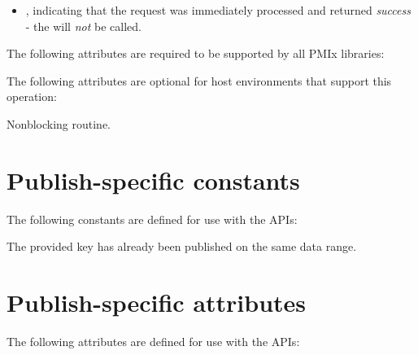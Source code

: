 \returnsimplenb

\returnstart
\begin{itemize}
    \item {}, indicating that the request was immediately processed and returned \textit{success} - the  will \textit{not} be called.
\end{itemize}
\returnend

\reqattrstart
The following attributes are required to be supported by all PMIx libraries:

\reqattrend

\optattrstart
The following attributes are optional for host environments that support this operation:


\optattrend

\descr

Nonblocking  routine.


\section{Publish-specific constants}

The following constants are defined for use with the  \acp{API}:

\begin{constantdesc}
%
The provided key has already been published on the same data range.
%
\end{constantdesc}


\section{Publish-specific attributes}

The following attributes are defined for use with the  \acp{API}:


